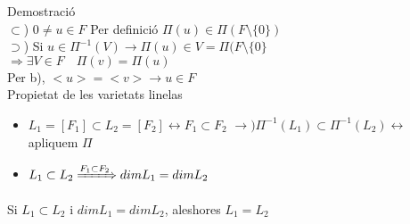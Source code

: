 \documentclass{article}
\begin{document}
Demostració\\
$\subset$) $0 \neq u \in F$ Per definició $\Pi(u) \in \Pi (F\setminus\{0\})$\\
$\supset$) Si $u \in \Pi^{-1}(V) \to \Pi(u) \in V = \Pi(F\setminus\{0\}$\\
$\Rightarrow \exists V \in F\quad \Pi(v) = \Pi(u)$\\
Per b), $<u> = <v> \to u \in F$\\

Propietat de les varietats linelas
\begin{itemize}
\item $L_1 = [F_1] \subset L_2 = [F_2] \leftrightarrow F_1 \subset F_2$
	\subitem $\to) \Pi^{-1}(L_1) \subset \Pi^{-1}(L_2) \leftrightarrow$ apliquem $\Pi$
\item $L_1 \subset L_2 \xRightarrow{F_1 \subset F_2} dim L_1 = dim L_2$
\end{itemize}
Si $L_1 \subset L_2$ i $dim L_1 = dim L_2$, aleshores $L_1 = L_2$
\end{document}
